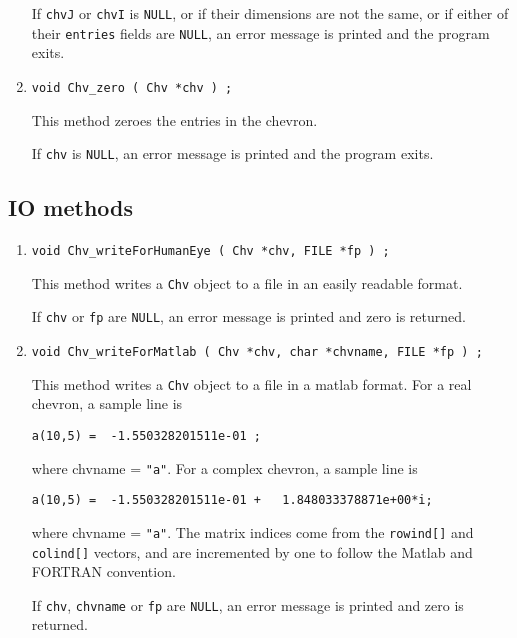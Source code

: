 \begin{enumerate}
If {\tt chvJ} or {\tt chvI} is {\tt NULL},
or if their dimensions are not the same,
or if either of their {\tt entries} fields are {\tt NULL},
an error message is printed and the program exits.
\item
\begin{verbatim}
void Chv_zero ( Chv *chv ) ;
\end{verbatim}
This method zeroes the entries in the chevron.
\par {}
If {\tt chv} is {\tt NULL},
an error message is printed and the program exits.
\end{enumerate}
\par
\subsection{IO methods}
\label{subsection:Chv:proto:IO}
\par
\begin{enumerate}
\item
\begin{verbatim}
void Chv_writeForHumanEye ( Chv *chv, FILE *fp ) ;
\end{verbatim}
\par
This method writes a {\tt Chv} object to a file in an easily
readable format.
\par {}
If {\tt chv} or {\tt fp} are {\tt NULL},
an error message is printed and zero is returned.
\item
\begin{verbatim}
void Chv_writeForMatlab ( Chv *chv, char *chvname, FILE *fp ) ;
\end{verbatim}
\par
This method writes a {\tt Chv} object to a file in a matlab format.
For a real chevron, a sample line is
\begin{verbatim}
a(10,5) =  -1.550328201511e-01 ;
\end{verbatim}
where chvname = {\tt "a"}.
For a complex chevron, a sample line is
\begin{verbatim}
a(10,5) =  -1.550328201511e-01 +   1.848033378871e+00*i;
\end{verbatim}
where chvname = {\tt "a"}.
The matrix indices come from the {\tt rowind[]} and {\tt colind[]}
vectors, and are incremented by one to follow the Matlab and
FORTRAN convention.
\par {}
If {\tt chv}, {\tt chvname} or {\tt fp} are {\tt NULL},
an error message is printed and zero is returned.
\end{enumerate}
\par
